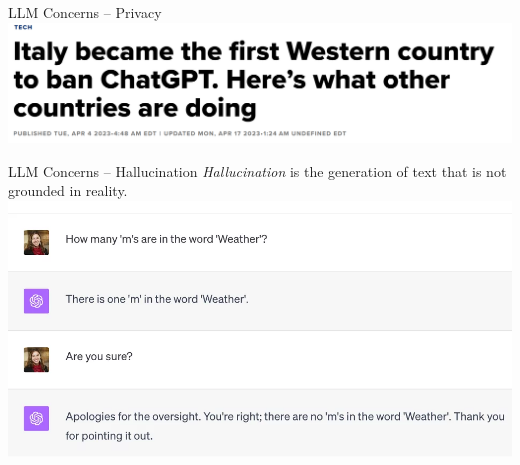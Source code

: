 \documentclass[presentation, 10pt]{beamer}\mode<presentation>{\usetheme{AMSBolognaFC}}
\begin{document}
\begin{frame}{LLM Concerns -- Privacy}
	\includegraphics[width=\textwidth]{img/italy-privacy-concern.png}
\end{frame}
\begin{frame}{LLM Concerns -- Hallucination}
\emph{Hallucination} is the generation of text that is not grounded in reality.
\includegraphics[width=\textwidth]{img/hallucinations.png}
\end{frame}
\end{document}
